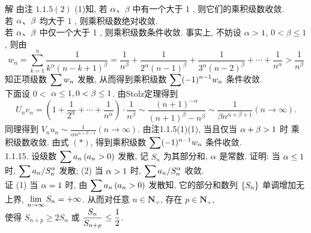 \documentclass[a4paper,11pt,UTF8]{article}
\begin{document}
解 由注 $1.1 .5(2)$ (1)知, 若 $\displaystyle \displaystyle \displaystyle \alpha $、$ \beta$ 中有一个大于 1 , 则它们的乘积级数收敛.\\
若 $\displaystyle \displaystyle \displaystyle \alpha $、$\displaystyle \displaystyle \beta$ 均大于 1 , 则乘积级数绝对收敛.\\
若 $\displaystyle \displaystyle \displaystyle \alpha$、$\displaystyle \displaystyle \displaystyle \beta$ 中仅一个大于 1 , 则乘积级数条件收敛. 事实上, 不妨设 $\displaystyle \displaystyle \displaystyle \alpha>1$, $0<\beta \leq 1$, 则由
$$
w_n=\sum_{k=1}^n \frac{1}{k^\alpha(n-k+1)^\beta}=\frac{1}{n^\beta}+\frac{1}{2^\alpha(n-1)^\beta}+\frac{1}{3^\alpha(n-2)^\beta}+\cdots+\frac{1}{n^\alpha}>\frac{1}{n^\beta}
$$
知正项级数 $\displaystyle \displaystyle \displaystyle \sum w_n$ 发散, 从而得到乘积级数 $\displaystyle \displaystyle \displaystyle \sum(-1)^{n-1} w_n$ 条件收敛.\\
 下面设 $0<$ $\displaystyle \displaystyle \displaystyle \alpha \leq 1,0<\beta \leq 1$. 由Stolz定理得到
$$
U_n v_n=\left(1+\frac{1}{2^\alpha}+\cdots+\frac{1}{n^\alpha}\right) \cdot \frac{1}{n^\beta} \sim \frac{(n+1)^{-\alpha}}{(n+1)^\beta-n^\beta} \sim \frac{1}{\beta n^{\alpha+\beta+1}}(n \rightarrow \infty) .
$$
同理得到 $V_n u_n \sim \frac{1}{\alpha n^{\alpha+\beta-1}}(n \rightarrow \infty)$. 由注1.1.5(1)(1), 当且仅当 $\displaystyle \displaystyle \displaystyle \alpha+\beta>1$ 时 乘积级数收敛. 由式 $(*)$, 得到乘积级数 $\displaystyle \displaystyle \displaystyle \sum(-1)^{n-1} w_n$ 条件收敛.\\
1.1.15. 设级数 $\displaystyle \displaystyle \displaystyle \sum a_n\left(a_n>0\right)$ 发散, 记 $S_n$ 为其部分和, $\displaystyle \displaystyle \displaystyle \alpha$ 是常数. 证明: 当 $\displaystyle \displaystyle \displaystyle \alpha \leq 1$ 时, $\displaystyle \displaystyle \displaystyle \sum a_n / S_n^\alpha$ 发散; (2) 当 $\displaystyle \displaystyle \displaystyle \alpha>1$ 时, $\displaystyle \displaystyle \displaystyle \sum a_n / S_n^\alpha$ 收敛.\\
证 (1) 当 $\displaystyle \displaystyle \displaystyle \alpha=1$ 时, 由 $\displaystyle \displaystyle \displaystyle \sum a_n\left(a_n>0\right)$ 发散知, 它的部分和数列 $\displaystyle \displaystyle \displaystyle \left\{S_n\right\}$ 单调增加无上界, $\displaystyle \displaystyle \displaystyle \lim _{n \rightarrow \infty} S_n=+\infty$. 从而对任意 $n \in \mathbf{N}_{+}$, 存在 $p \in \mathbf{N}_{+}$,\\
使得 $S_{n+p} \geq 2 S_n$ 或 $\displaystyle \displaystyle \displaystyle \frac{S_n}{S_{n+p}} \leq \frac{1}{2}$.\\
\end{document}
